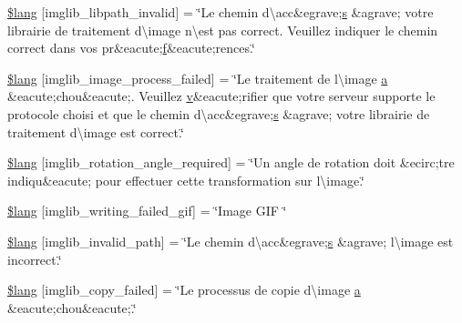 \begin{DoxyCompactItemize}
\hyperlink{application_2language_2french_2imglib__lang_8php_a8f190c17a02ca89334c8bf0a04333f65}{\$lang} \mbox{[}\textquotesingle{}imglib\+\_\+libpath\+\_\+invalid\textquotesingle{}\mbox{]} = \char`\"{}Le chemin d\textbackslash{}\textquotesingle{}acc\&egrave;\hyperlink{paste_2plugin_8min_8js_a43ae144ee2a4e493fea41ca42f795b14}{s} \&agrave; votre librairie de traitement d\textbackslash{}\textquotesingle{}image n\textbackslash{}\textquotesingle{}est pas correct. Veuillez indiquer le chemin correct dans vos pr\&eacute;\hyperlink{jquery-ui_8min_8js_a9cf09a2972472098a4c689fd988f4dfc}{f}\&eacute;rences.\char`\"{}
\item 
\hyperlink{application_2language_2french_2imglib__lang_8php_a9ac6659eb97dd12e5c714cc9635cf22e}{\$lang} \mbox{[}\textquotesingle{}imglib\+\_\+image\+\_\+process\+\_\+failed\textquotesingle{}\mbox{]} = \char`\"{}Le traitement de l\textbackslash{}\textquotesingle{}image \hyperlink{_chart_8min_8js_aef3b685c08bc6c76c8e729bd0e93901d}{a} \&eacute;chou\&eacute;. Veuillez \hyperlink{_chart_8min_8js_afc3dd12de12777f6e20b4c93b7e7cb96}{v}\&eacute;rifier que votre serveur supporte le protocole choisi et que le chemin d\textbackslash{}\textquotesingle{}acc\&egrave;\hyperlink{paste_2plugin_8min_8js_a43ae144ee2a4e493fea41ca42f795b14}{s} \&agrave; votre librairie de traitement d\textbackslash{}\textquotesingle{}image est correct.\char`\"{}
\item 
\hyperlink{application_2language_2french_2imglib__lang_8php_a1110d59ea8fd0564e78068dbda3438fb}{\$lang} \mbox{[}\textquotesingle{}imglib\+\_\+rotation\+\_\+angle\+\_\+required\textquotesingle{}\mbox{]} = \char`\"{}Un angle de rotation doit \&ecirc;tre indiqu\&eacute; pour effectuer cette transformation sur l\textbackslash{}\textquotesingle{}image.\char`\"{}
\item 
\hyperlink{application_2language_2french_2imglib__lang_8php_a6169e9ed18d970dcc8965c4f195ae3e7}{\$lang} \mbox{[}\textquotesingle{}imglib\+\_\+writing\+\_\+failed\+\_\+gif\textquotesingle{}\mbox{]} = \char`\"{}Image G\+IF \char`\"{}
\item 
\hyperlink{application_2language_2french_2imglib__lang_8php_a8ff486c25806a4731d1ffe20431df825}{\$lang} \mbox{[}\textquotesingle{}imglib\+\_\+invalid\+\_\+path\textquotesingle{}\mbox{]} = \char`\"{}Le chemin d\textbackslash{}\textquotesingle{}acc\&egrave;\hyperlink{paste_2plugin_8min_8js_a43ae144ee2a4e493fea41ca42f795b14}{s} \&agrave; l\textbackslash{}\textquotesingle{}image est incorrect.\char`\"{}
\item 
\hyperlink{application_2language_2french_2imglib__lang_8php_a9363000d2005b8276b39d581a11b562d}{\$lang} \mbox{[}\textquotesingle{}imglib\+\_\+copy\+\_\+failed\textquotesingle{}\mbox{]} = \char`\"{}Le processus de copie d\textbackslash{}\textquotesingle{}image \hyperlink{_chart_8min_8js_aef3b685c08bc6c76c8e729bd0e93901d}{a} \&eacute;chou\&eacute;.\char`\"{}

\end{DoxyCompactItemize}
